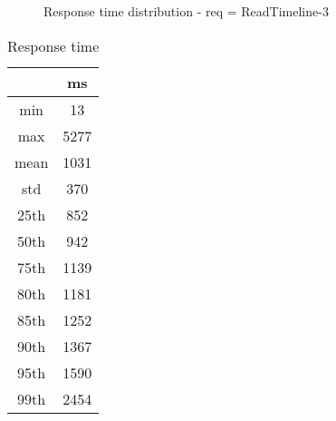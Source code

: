 \begin{minipage}{0.75\linewidth}
\begin{figure}[h]
\begin{adjustbox}{max width=1.0\linewidth, keepaspectratio}
  \end{adjustbox}
  \caption{Response time distribution - req = ReadTimeline-3}
\end{figure}
\end{minipage}\hfill\begin{minipage}{0.18\linewidth}
\begin{table}[h]
\begin{tabular}{|cc|}
\hline
\textbf{} & \textbf{ms}\\ \hline
 \Xhline{0.005\arrayrulewidth}
min & 13\\
 \Xhline{0.005\arrayrulewidth}
max & 5277\\
 \Xhline{0.005\arrayrulewidth}
mean & 1031\\
 \Xhline{0.005\arrayrulewidth}
std & 370\\
\hline
\hline
 \Xhline{0.005\arrayrulewidth}
25th & 852\\
 \Xhline{0.005\arrayrulewidth}
50th & 942\\
 \Xhline{0.005\arrayrulewidth}
75th & 1139\\
 \Xhline{0.005\arrayrulewidth}
80th & 1181\\
 \Xhline{0.005\arrayrulewidth}
85th & 1252\\
 \Xhline{0.005\arrayrulewidth}
90th & 1367\\
 \Xhline{0.005\arrayrulewidth}
95th & 1590\\
 \Xhline{0.005\arrayrulewidth}
99th & 2454\\
\hline
\end{tabular}
\caption{Response time}
\end{table}
\end{minipage}\hfill